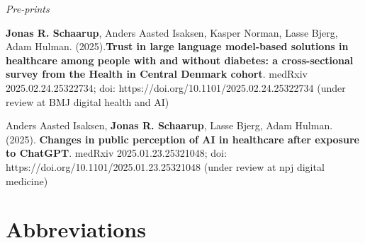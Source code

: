 \documentclass[
  letterpaper,
  headsepline=true,
  open=any]{scrbook}
\begin{document}
\emph{Pre-prints}

\textbf{Jonas R. Schaarup}, Anders Aasted Isaksen, Kasper Norman, Lasse
Bjerg, Adam Hulman. (2025).\textbf{Trust in large language model-based
solutions in healthcare among people with and without diabetes: a
cross-sectional survey from the Health in Central Denmark cohort}.
medRxiv 2025.02.24.25322734; doi:
https://doi.org/10.1101/2025.02.24.25322734 (under review at BMJ digital
health and AI)

Anders Aasted Isaksen, \textbf{Jonas R. Schaarup}, Lasse Bjerg, Adam
Hulman. (2025). \textbf{Changes in public perception of AI in healthcare
after exposure to ChatGPT}. medRxiv 2025.01.23.25321048; doi:
https://doi.org/10.1101/2025.01.23.25321048 (under review at npj digital
medicine)

\newpage

{\let\clearpage\relax \tableofcontents} 

\listoffigures

\listoftables


\hypertarget{abbreviations}{%
\chapter*{Abbreviations}\label{abbreviations}}

\end{document}

